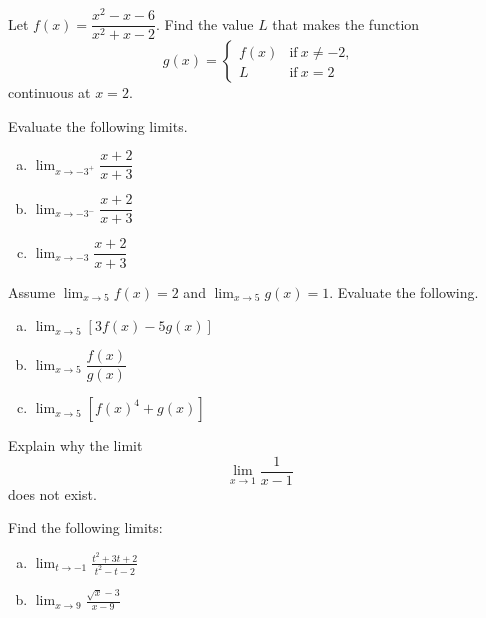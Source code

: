 \documentclass[10pt]{amsart}
\begin{document}
\begin{thm}
  Let \(f(x) = \dfrac{x^2 - x - 6}{x^2 + x - 2}\).
  Find the value \(L\) that makes the function
  \[g(x) = \left\{\begin{array}{ll}
  f(x) & \text{if}\ x \neq -2,\\
  L & \text{if}\ x = 2
  \end{array}
  \right.\]
  continuous at \(x = 2\).
\end{thm}

\vspace{2in}

\begin{thm}
  Evaluate the following limits.
  \begin{multicols}{3}
  \begin{enumerate}[(a)]
  \item
    \(\lim_{x\to -3^+}\dfrac{x+2}{x+3}\)
  \item
    \(\lim_{x\to -3^-}\dfrac{x+2}{x+3}\)
  \item
    \(\lim_{x\to -3}\dfrac{x+2}{x+3}\)
  \end{enumerate}
\end{multicols}
\end{thm}

\vspace{2in}

\begin{thm}
  Assume \(\lim_{x\to 5}f(x)=2\) and \(\lim_{x\to 5}g(x)=1\).
  Evaluate the following.
  \begin{multicols}{3}
  \begin{enumerate}[(a)]
  \item
    \(\lim_{x\to 5} [3f(x)-5g(x)]\)
  \item
    \(\lim_{x\to 5} \dfrac{f(x)}{g(x)}\)
  \item
    \(\lim_{x\to 5} [f(x)^4+g(x)]\)
  \end{enumerate}
  \end{multicols}
\end{thm}

\vspace{1in}

\begin{thm}
  Explain why the limit $$\lim_{x\rightarrow 1}\frac{1}{x-1}$$ does not exist.
\end{thm}

\begin{thm}
  Find the following limits:
  \begin{multicols}{2}
  \begin{enumerate}[(a)]
  \item
    \(\lim_{t\rightarrow -1}\frac{t^2+3t+2}{t^2-t-2}\)
  \item
    \(\lim_{x\rightarrow 9}\frac{\sqrt{x}-3}{x-9}\)
  \end{enumerate}
  \end{multicols}
\end{thm}
\end{document}
